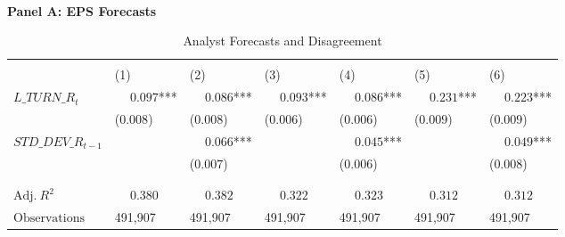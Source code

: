 
\begin{table}



\caption[Analyst Forecasts and Disagreement]{\label{tab:reg_disagreement_and_forecast_accuracy_old}Analyst Forecasts and Disagreement}
\centering
\fontsize{9}{11}\selectfont
\begin{threeparttable}
\phantom{ }\\
\textbf{Panel A: EPS Forecasts}
\begin{tabular}[t]{>{\raggedright\arraybackslash}p{3.1cm}>{\raggedright\arraybackslash}p{1.6cm}>{\raggedright\arraybackslash}p{1.6cm}>{\raggedright\arraybackslash}p{1.6cm}>{\raggedright\arraybackslash}p{1.6cm}>{\raggedright\arraybackslash}p{1.6cm}>{\raggedright\arraybackslash}p{1.6cm}}
\toprule
\multicolumn{1}{c}{ } & \multicolumn{2}{c}{$EPS\_DISP\_R_t$} & \multicolumn{2}{c}{$EPS\_AFE\_R_t$} & \multicolumn{2}{c}{$EPS\_RANGE\_R_t$} \\
\cmidrule(l{3pt}r{3pt}){2-3} \cmidrule(l{3pt}r{3pt}){4-5} \cmidrule(l{3pt}r{3pt}){6-7}
 & \phantom{-}(1) & \phantom{-}(2) & \phantom{-}(3) & \phantom{-}(4) & \phantom{-}(5) & \phantom{-}(6)\\
\midrule
$L\_TURN\_R_t$ & $\phantom{-}0.097$*** & $\phantom{-}0.086$*** & $\phantom{-}0.093$*** & $\phantom{-}0.086$*** & $\phantom{-}0.231$*** & $\phantom{-}0.223$***\\
 & (\phantom{-}$0.008$) & (\phantom{-}$0.008$) & (\phantom{-}$0.006$) & (\phantom{-}$0.006$) & (\phantom{-}$0.009$) & (\phantom{-}$0.009$)\\
\addlinespace
$STD\_DEV\_R_{t-1}$ &  & $\phantom{-}0.066$*** &  & $\phantom{-}0.045$*** &  & $\phantom{-}0.049$***\\
 &  & (\phantom{-}$0.007$) &  & (\phantom{-}$0.006$) &  & (\phantom{-}$0.008$)\\
 &  &  &  &  &  \vphantom{1} & \\
\midrule
 &  &  &  &  &  & \\
$\textrm{Adj.} \: R^2$ & {$\phantom{-}0.380$} & {$\phantom{-}0.382$} & {$\phantom{-}0.322$} & {$\phantom{-}0.323$} & {$\phantom{-}0.312$} & {$\phantom{-}0.312$}\\
$\textrm{Observations}$ & {\phantom{-}491,907} & {\phantom{-}491,907} & {\phantom{-}491,907} & {\phantom{-}491,907} & {\phantom{-}491,907} & {\phantom{-}491,907}\\
\bottomrule
\end{tabular}
\begin{tablenotes}
\item 
\end{tablenotes}
\end{threeparttable}




\end{table}
